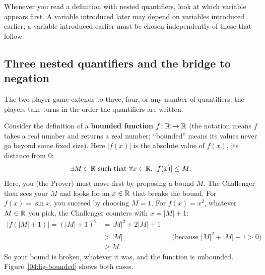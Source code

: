\begin{focusbox}
Whenever you read a definition with nested quantifiers, look at which variable appears first. A variable introduced later may depend on variables introduced earlier; a variable introduced earlier must be chosen independently of those that follow.
\end{focusbox}

\subsection{Three nested quantifiers and the bridge to negation}

The two-player game extends to three, four, or any number of quantifiers: the players take turns in the order the quantifiers are written.

Consider the definition of a \textbf{bounded function} $f \colon \mathbb{R} \to \mathbb{R}$ (the notation means $f$ takes a real number and returns a real number; ``bounded'' means its values never go beyond some fixed size). Here $|f(x)|$ is the absolute value of $f(x)$, its distance from $0$:
\[
\exists M \in \mathbb{R} \text{ such that } \forall x \in \mathbb{R}, \, |f(x)| \le M.
\]
Here, you (the Prover) must move first by proposing a bound $M$. The Challenger then sees your $M$ and looks for an $x \in \mathbb{R}$ that breaks the bound. For $f(x) = \sin x$, you succeed by choosing $M = 1$. For $f(x) = x^2$, whatever $M \in \mathbb{R}$ you pick, the Challenger counters with $x = |M| + 1$:
\begin{align*}
|f(|M| + 1)| = (|M| + 1)^2 &= |M|^2 + 2|M| + 1 \\
&> |M| && \text{(because } |M|^2 + |M| + 1 > 0\text{)} \\
&\ge M.
\end{align*}
So your bound is broken, whatever it was, and the function is unbounded. Figure~\ref{04:fig-bounded} shows both cases.

